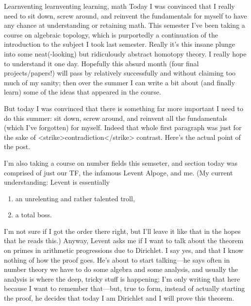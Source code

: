 Learnventing
learnventing
learning, math
Today I was convinced that I really need to sit down, screw around,
and reinvent the fundamentals for myself to have any chance at
understanding or retaining math.
This semester I've been taking a course on algebraic topology, which
is purportedly a continuation of the introduction to the subject I
took last semester. Really it's this insane plunge into some
neat(-looking) but ridiculously abstract homotopy theory. I really
hope to understand it one day. Hopefully this absurd month (four final
projects/papers!) will pass by relatively successfully and without
claiming too much of my sanity; then over the summer I can write a bit
about (and finally learn) some of the ideas that appeared in the
course. 

But today I was convinced that there is something far more important I
need to do this summer: sit down, screw around, and reinvent all the
fundamentals (which I've forgotten) for myself. Indeed that whole
first paragraph was just for the sake of
<strike>contradiction</strike> contrast. Here's the actual point of
the post.

I'm also taking a course on number fields this semseter, and section
today was comprised of just our TF, the infamous Levent Alpoge, and
me. (My current understanding: Levent is essentially
\begin{enumerate}
\item an unrelenting and rather talented troll,
\item a total boss.
\end{enumerate}
I'm not sure if I got the order there right, but I'll leave it like
that in the hopes that he reads this.) Anyway, Levent asks me if I
want to talk about the theorem on primes in arithmetic progressions
due to Dirichlet. I say yes, and that I know nothing of how the proof
goes. He's about to start talking---he says often in number theory we
have to do some algebra and some analysis, and usually the analysis is
where the deep, tricky stuff is happening; I'm only writing that here
because I want to remember that---but, true to form, instead
of actually starting the proof, he decides that today I am Dirichlet
and I will prove this theorem. 

